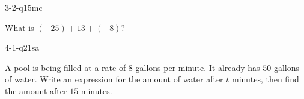 \begin{practiceQuestion}{3-2-q15}{mc}
\begin{questionText}
What is $(-25) + 13 + (-8)$?
\end{questionText}
\end{practiceQuestion}

\begin{practiceQuestion}{4-1-q21}{sa}
\begin{questionText}
A pool is being filled at a rate of $8$ gallons per minute. It already has $50$ gallons of water. Write an expression for the amount of water after $t$ minutes, then find the amount after $15$ minutes.
\end{questionText}
\end{practiceQuestion}

